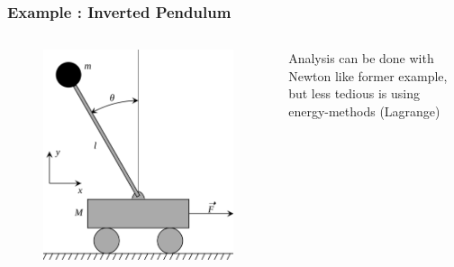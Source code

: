 \begin{frame}
	\frametitle{Example : Inverted Pendulum}
	\begin{columns}
		\begin{column}{0.6\linewidth}
			\begin{figure}
				\includegraphics[width=1\linewidth]{img/pendulum-inverted}
				\label{fig:pendulum-inverted}
			\end{figure}
		\end{column}
		\begin{column}{0.4\linewidth}
			Analysis can be done with Newton like former example, but less tedious is using energy-methods (Lagrange)
			
		\end{column}
	\end{columns}
	
\end{frame}

